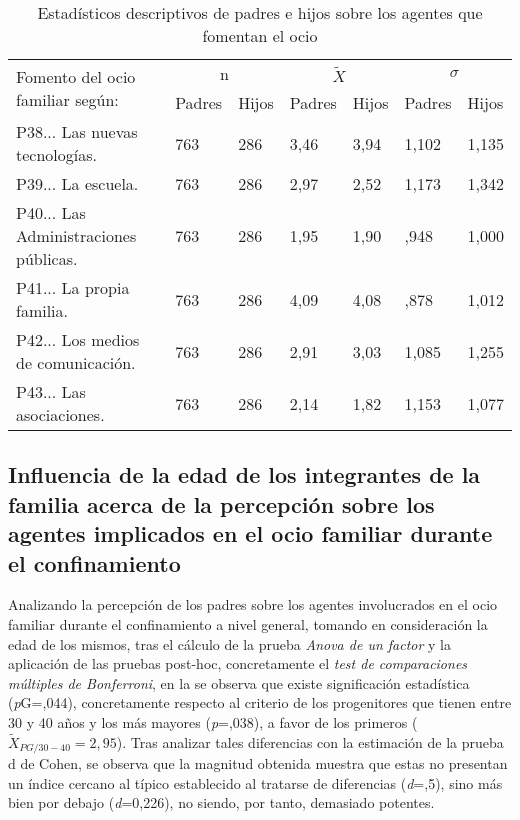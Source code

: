 \documentclass{textolivre}
\begin{document}
\begin{table}[htpb]
\caption{Estadísticos descriptivos de padres e hijos sobre los agentes que fomentan el ocio}
\label{tab2}
\centering
\begin{tabular}{lllllll}
\toprule
\multirow{2}{*}{Fomento del ocio familiar según:} & \multicolumn{2}{c}{n} & \multicolumn{2}{c}{$\tilde{X}$} & \multicolumn{2}{c}{\begin{math}\sigma\end{math}}
\\
& Padres & Hijos & Padres & Hijos & Padres & Hijos
\\
\midrule
P38... Las nuevas tecnologías. & 763 & 286 & 3,46 & 3,94 & 1,102 & 1,135
\\
P39... La escuela. & 763 & 286 & 2,97 & 2,52 & 1,173 & 1,342
\\
P40... Las Administraciones públicas. & 763 & 286 & 1,95 & 1,90 & ,948 & 1,000
\\
P41... La propia familia. & 763 & 286 & 4,09 & 4,08 & ,878 & 1,012
\\
P42... Los medios de comunicación. & 763 & 286 & 2,91 & 3,03 & 1,085 & 1,255
\\
P43... Las asociaciones. & 763 & 286 & 2,14 & 1,82 & 1,153 & 1,077
\\
\bottomrule
\end{tabular}
\centering
{}
\end{table}

\subsection{Influencia de la edad de los integrantes de la familia acerca de la percepción sobre los agentes implicados en el ocio familiar durante el confinamiento}
Analizando la percepción de los padres sobre los agentes involucrados en el ocio familiar durante el confinamiento a nivel general, tomando en consideración la edad de los mismos, tras el cálculo de la prueba \emph{Anova de un factor} y la aplicación de las pruebas post-hoc, concretamente el \emph{test de comparaciones múltiples de Bonferroni}, en la  se observa que existe significación estadística (\emph{p}G=,044), concretamente respecto al criterio de los progenitores que tienen entre 30 y 40 años y los más mayores (\emph{p}=,038), a favor de los primeros ($\tilde{X}_{PG/30-40}=2,95$). Tras analizar tales diferencias con la estimación de la prueba d de Cohen, se observa que la magnitud obtenida muestra que estas no presentan un índice cercano al típico establecido al tratarse de diferencias (\emph{d}=,5), sino más bien por debajo (\emph{d}=0,226), no siendo, por tanto, demasiado potentes. 
\end{document}
